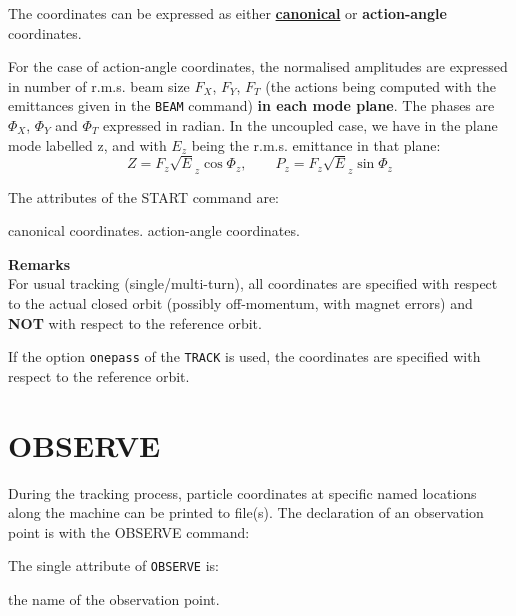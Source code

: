 The coordinates can be expressed as either
\href{../Introduction/tables.html#canon}{\textbf{canonical}}
or \textbf{action-angle} coordinates.

          
For the case of action-angle coordinates, the normalised amplitudes are
expressed in number of r.m.s. beam size $F_X$, $F_Y$, $F_T$ (the actions
being computed with the emittances given in the \texttt{BEAM} command)
\textbf{in each mode plane}. 
The phases are $\Phi_X$, $\Phi_Y$ and $\Phi_T$ expressed in
radian. In the uncoupled case, we have in the plane mode labelled z, and
with $E_z$ being the r.m.s. emittance in that plane:\\
\begin{equation}
Z = F_z \sqrt E_z \cos\Phi_z , \qquad P_z= F_z \sqrt E_z \sin\Phi_z
\end{equation}

The attributes of the START command are:
\begin{madlist}
   canonical coordinates. 
   action-angle coordinates.
\end{madlist}

{\bf Remarks} \\
For usual tracking (single/multi-turn), all coordinates are specified
with respect to the actual closed orbit (possibly off-momentum, with
magnet errors) and \textbf{NOT} with respect to the reference orbit.  

If the option \texttt{onepass} of the \texttt{TRACK} is used, the
coordinates are specified with respect to the reference orbit. 
            


\section{OBSERVE}
\label{sec:observe}

During the tracking process, particle coordinates at specific named
locations along the machine can be printed to file(s). The declaration of
an observation point is with the OBSERVE command: 


The single attribute of \texttt{OBSERVE} is:
\begin{madlist}
   the name of the observation point. 
\end{madlist}
  
